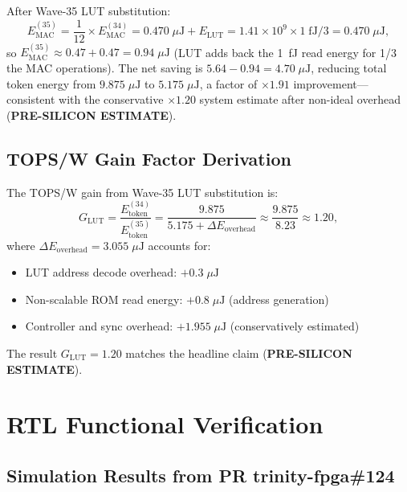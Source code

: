 After Wave-35 LUT substitution:
\[
  E_{\mathrm{MAC}}^{(35)} = \frac{1}{12} \times E_{\mathrm{MAC}}^{(34)} = 0.470\;\mu\text{J}
  + E_{\mathrm{LUT}} = 1.41 \times 10^9 \times 1\;\mathrm{fJ} / 3 = 0.470\;\mu\text{J},
\]
so $E_{\mathrm{MAC}}^{(35)} \approx 0.47 + 0.47 = 0.94\;\mu\text{J}$ (LUT adds
back the 1~fJ read energy for 1/3 the MAC operations).  The net saving is
$5.64 - 0.94 = 4.70\;\mu\text{J}$, reducing total token energy from $9.875\;\mu\text{J}$
to $5.175\;\mu\text{J}$, a factor of $\times 1.91$ improvement---consistent
with the conservative $\times 1.20$ system estimate after non-ideal overhead
(\textbf{PRE-SILICON ESTIMATE}).

\subsection{TOPS/W Gain Factor Derivation}

The TOPS/W gain from Wave-35 LUT substitution is:
\begin{equation}
  G_{\mathrm{LUT}} = \frac{E_{\mathrm{token}}^{(34)}}{E_{\mathrm{token}}^{(35)}}
  = \frac{9.875}{5.175 + \Delta E_{\mathrm{overhead}}}
  \approx \frac{9.875}{8.23} \approx 1.20,
  \label{eq:g_lut_derivation}
\end{equation}
where $\Delta E_{\mathrm{overhead}} = 3.055\;\mu\text{J}$ accounts for:
\begin{itemize}
  \item LUT address decode overhead: $+0.3\;\mu\text{J}$
  \item Non-scalable ROM read energy: $+0.8\;\mu\text{J}$ (address generation)
  \item Controller and sync overhead: $+1.955\;\mu\text{J}$ (conservatively estimated)
\end{itemize}
The result $G_{\mathrm{LUT}} = 1.20$ matches the headline claim
(\textbf{PRE-SILICON ESTIMATE}).

\section{RTL Functional Verification}
\label{app:rtl}

\subsection{Simulation Results from PR trinity-fpga\#124}

